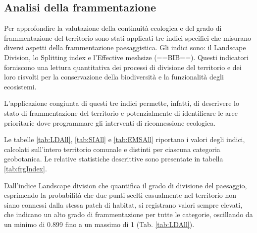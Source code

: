 \documentclass[
]{book}
\begin{document}
\subsection{Analisi della frammentazione}\label{analisi-della-frammentazione-1}

Per approfondire la valutazione della continuità ecologica e del grado di frammentazione del territorio sono stati applicati tre indici specifici che misurano diversi aspetti della frammentazione paesaggistica.
Gli indici sono: il Landscape Division, lo Splitting index e l'Effective meshsize (==BIB==).
Questi indicatori forniscono una lettura quantitativa dei processi di divisione del territorio e dei loro risvolti per la conservazione della biodiversità e la funzionalità degli ecosistemi.

L'applicazione congiunta di questi tre indici permette, infatti, di descrivere lo stato di frammentazione del territorio e potenzialmente di identificare le aree prioritarie dove programmare gli interventi di riconnessione ecologica.

Le tabelle \ref{tab:LDAll}, \ref{tab:SIAll} e \ref{tab:EMSAll} riportano i valori degli indici, calcolati sull'intero territorio comunale e distinti per ciascuna categoria geobotanica.
Le relative statistiche descrittive sono presentate in tabella \ref{tab:frgIndex}.

Dall'indice Landscape division che quantifica il grado di divisione del paesaggio, esprimendo la probabilità che due punti scelti casualmente nel territorio non siano connessi dalla stessa patch di habitat, si registrano valori sempre elevati, che indicano un alto grado di frammentazione per tutte le categorie, oscillando da un minimo di 0.899 fino a un massimo di 1 (Tab. \ref{tab:LDAll}).
\end{document}
